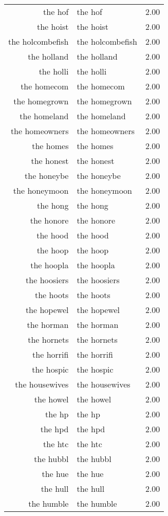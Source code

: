\begin{table}[ht]
\begin{tabular}{rlr}
  the hof & the hof & 2.00 \\ 
  the hoist & the hoist & 2.00 \\ 
  the holcombefish & the holcombefish & 2.00 \\ 
  the holland & the holland & 2.00 \\ 
  the holli & the holli & 2.00 \\ 
  the homecom & the homecom & 2.00 \\ 
  the homegrown & the homegrown & 2.00 \\ 
  the homeland & the homeland & 2.00 \\ 
  the homeowners & the homeowners & 2.00 \\ 
  the homes & the homes & 2.00 \\ 
  the honest & the honest & 2.00 \\ 
  the honeybe & the honeybe & 2.00 \\ 
  the honeymoon & the honeymoon & 2.00 \\ 
  the hong & the hong & 2.00 \\ 
  the honore & the honore & 2.00 \\ 
  the hood & the hood & 2.00 \\ 
  the hoop & the hoop & 2.00 \\ 
  the hoopla & the hoopla & 2.00 \\ 
  the hoosiers & the hoosiers & 2.00 \\ 
  the hoots & the hoots & 2.00 \\ 
  the hopewel & the hopewel & 2.00 \\ 
  the horman & the horman & 2.00 \\ 
  the hornets & the hornets & 2.00 \\ 
  the horrifi & the horrifi & 2.00 \\ 
  the hospic & the hospic & 2.00 \\ 
  the housewives & the housewives & 2.00 \\ 
  the howel & the howel & 2.00 \\ 
  the hp & the hp & 2.00 \\ 
  the hpd & the hpd & 2.00 \\ 
  the htc & the htc & 2.00 \\ 
  the hubbl & the hubbl & 2.00 \\ 
  the hue & the hue & 2.00 \\ 
  the hull & the hull & 2.00 \\ 
  the humble & the humble & 2.00 \\ 

\end{tabular}
\end{table}
